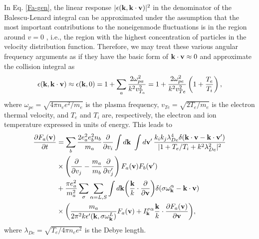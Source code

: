 \documentclass[12pt,a4paper,ruledheader]{report}
\begin{document}
In Eq. \eqref{Fa-gen}, the linear response $|\epsilon({\bf k},
{\bf k\cdot v})|^2$ in the denominator of the Balescu-Lenard
integral can be approximated under the assumption that the most
important contributions to the noneigenmode fluctuations is in
the region around $v=0$ , i.e., the region with the highest
concentration of particles in the velocity distribution function.
Therefore, we may treat these various angular frequency arguments
as if they have the basic form of ${\bf k \cdot v}\approx 0$ and
approximate the collision integral as
\begin{equation}
  \label{approx}
  \epsilon({\bf k},{\bf k \cdot v})\approx
  \epsilon({\bf k},0)=1+\sum_a \frac{2 \omega_{pa}^2}{k^2v_{T_a}^2}
  =1+\frac{2 \omega_{pe}^2}{k^2v_{Te}^2}\left( 1+\frac{T_e}{T_i} \right),
\end{equation}
where $\omega_{pe}=\sqrt{4 \pi n_e e^2/m_e}$ is the plasma frequency,
$v_{Te}= \sqrt{2T_e/m_e}$ is the electron thermal velocity, and $T_e$
and $T_i$ are, respectively, the electron and ion temperature expressed
in units of energy. This leads to
\begin{equation}
\begin{split}
  \frac{\partial F_a({\bf v})}{\partial t}
  &=\sum_b\frac{2e_a^2e_b^2n_b}{m_a}\frac{\partial }{\partial v_i}
  \int d{\bf k}\ \int d{\bf v'}\,
  \frac{k_ik_j\lambda_{De}^4\delta({\bf k \cdot v - k \cdot v'})}
    {|1+T_e/T_i+k^2 \lambda_{De}^2|^2}\\
  &\times \left(\frac{\partial }{\partial v_j} -\frac{m_a}{m_b}
    \frac{\partial }{\partial v'_j}\right)
  F_a({\bf v})F_b({\bf v'})\\
  &+\frac{\pi e_a^2}{m_a^2}\sum_\sigma\sum_{\alpha=L,S}
  \int d{\bf k} \biggl(\frac{\bf k}{k}
\cdot\frac{\partial}{\partial{\bf v}}\biggr)
\delta(\sigma\omega_{\bf k}^\alpha-{\bf k}\cdot{\bf v})\\
&\times\biggl(\frac{m_a}{2\pi^2k\epsilon '({\bf k},\sigma\omega_{\bf k}^L)}
F_a({\bf v})+I_{\bf k}^{\sigma\alpha}
\frac{\bf k}{k}\cdot\frac{\partial F_a({\bf v})}{\partial{\bf v}}\biggr),
\end{split}
\label{Fa-gen-approx}
\end{equation}
where $\lambda_{De}=\sqrt{T_e/4\pi n_ee^2}$ is the Debye length.
\end{document}
